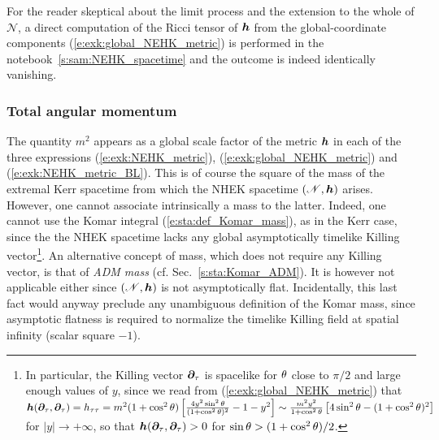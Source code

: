 \begin{remark}
For the reader skeptical about the limit process and the extension to the whole of $\mathscr{N}$,
a direct computation of the Ricci tensor of $\bm{h}$ from
the global-coordinate components (\ref{e:exk:global_NEHK_metric}) is performed
in the notebook~\ref{s:sam:NEHK_spacetime} and the outcome is indeed identically vanishing.
\end{remark}

\subsubsection{Total angular momentum}

The quantity $m^2$ appears as a global scale factor of the metric $\bm{h}$ in
each of the three expressions (\ref{e:exk:NEHK_metric}), (\ref{e:exk:global_NEHK_metric})
and (\ref{e:exk:NEHK_metric_BL}). This is of course the square of the mass of the extremal
Kerr spacetime from which the NHEK spacetime $(\mathscr{N},\bm{h})$ arises. However, one cannot
associate intrinsically a mass to the latter. Indeed, one cannot use the
Komar integral
(\ref{e:sta:def_Komar_mass}), as in the Kerr case, since the
the NHEK spacetime lacks any
global asymptotically timelike Killing vector\footnote{In particular, the Killing vector
$\bm{\partial}_\tau$ is spacelike for $\theta$ close to $\pi/2$ and large enough values of $y$, since
we read from (\ref{e:exk:global_NEHK_metric}) that
$\bm{h}(\bm{\partial}_\tau, \bm{\partial}_\tau) = h_{\tau\tau} = m^2 (1 + \cos^2\theta)
\left[ \frac{4 y^2 \sin^2\theta}{(1 + \cos^2\theta)^2} - 1 - y^2 \right]
\sim \frac{m^2 y^2}{1 + \cos^2\theta} \left[ 4 \sin^2\theta - (1 + \cos^2\theta)^2 \right]$
for $|y|\to +\infty$, so that $\bm{h}(\bm{\partial}_\tau, \bm{\partial}_\tau) > 0$ for
$\sin\theta > (1 + \cos^2\theta)/2$.}.
An alternative concept of mass, which does not require any Killing vector,
is that of \emph{ADM mass} (cf. Sec.~\ref{s:sta:Komar_ADM}).
It is however not applicable either since
$(\mathscr{N},\bm{h})$ is not asymptotically flat. Incidentally, this last fact would
anyway preclude any unambiguous definition of the Komar mass, since asymptotic flatness
is required to normalize the timelike Killing field  at spatial
infinity (scalar square $-1$).

